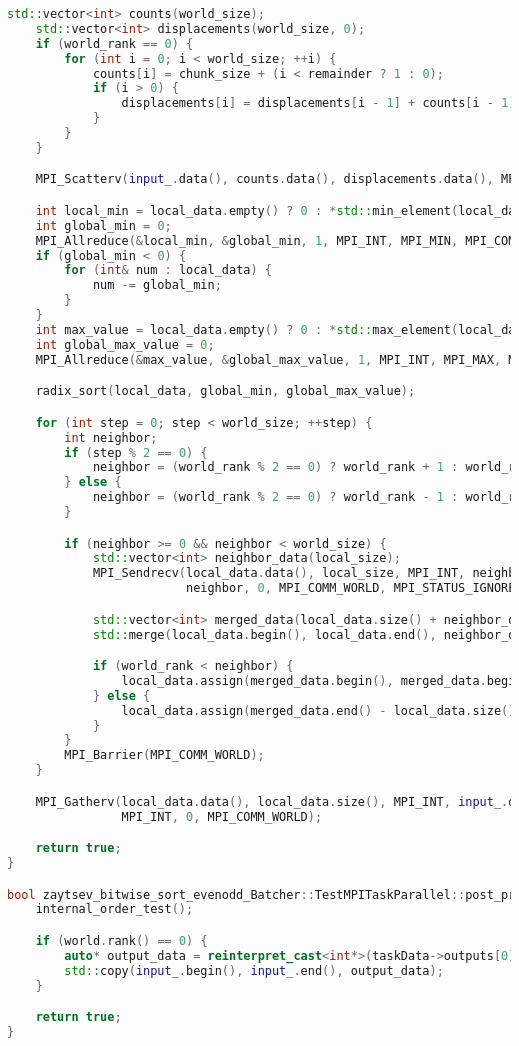 \documentclass[12pt]{article}
\begin{document}
\begin{lstlisting}[language=C++]
    std::vector<int> counts(world_size);
    std::vector<int> displacements(world_size, 0);
    if (world_rank == 0) {
        for (int i = 0; i < world_size; ++i) {
            counts[i] = chunk_size + (i < remainder ? 1 : 0);
            if (i > 0) {
                displacements[i] = displacements[i - 1] + counts[i - 1];
            }
        }
    }

    MPI_Scatterv(input_.data(), counts.data(), displacements.data(), MPI_INT, local_data.data(), local_size, MPI_INT, 0, MPI_COMM_WORLD);

    int local_min = local_data.empty() ? 0 : *std::min_element(local_data.begin(), local_data.end());
    int global_min = 0;
    MPI_Allreduce(&local_min, &global_min, 1, MPI_INT, MPI_MIN, MPI_COMM_WORLD);
    if (global_min < 0) {
        for (int& num : local_data) {
            num -= global_min;
        }
    }
    int max_value = local_data.empty() ? 0 : *std::max_element(local_data.begin(), local_data.end());
    int global_max_value = 0;
    MPI_Allreduce(&max_value, &global_max_value, 1, MPI_INT, MPI_MAX, MPI_COMM_WORLD);

    radix_sort(local_data, global_min, global_max_value);

    for (int step = 0; step < world_size; ++step) {
        int neighbor;
        if (step % 2 == 0) {
            neighbor = (world_rank % 2 == 0) ? world_rank + 1 : world_rank - 1;
        } else {
            neighbor = (world_rank % 2 == 0) ? world_rank - 1 : world_rank + 1;
        }

        if (neighbor >= 0 && neighbor < world_size) {
            std::vector<int> neighbor_data(local_size);
            MPI_Sendrecv(local_data.data(), local_size, MPI_INT, neighbor, 0, neighbor_data.data(), local_size, MPI_INT,
                         neighbor, 0, MPI_COMM_WORLD, MPI_STATUS_IGNORE);

            std::vector<int> merged_data(local_data.size() + neighbor_data.size());
            std::merge(local_data.begin(), local_data.end(), neighbor_data.begin(), neighbor_data.end(), merged_data.begin());

            if (world_rank < neighbor) {
                local_data.assign(merged_data.begin(), merged_data.begin() + local_data.size());
            } else {
                local_data.assign(merged_data.end() - local_data.size(), merged_data.end());
            }
        }
        MPI_Barrier(MPI_COMM_WORLD);
    }

    MPI_Gatherv(local_data.data(), local_data.size(), MPI_INT, input_.data(), counts.data(), displacements.data(),
                MPI_INT, 0, MPI_COMM_WORLD);

    return true;
}

bool zaytsev_bitwise_sort_evenodd_Batcher::TestMPITaskParallel::post_processing() {
    internal_order_test();

    if (world.rank() == 0) {
        auto* output_data = reinterpret_cast<int*>(taskData->outputs[0]);
        std::copy(input_.begin(), input_.end(), output_data);
    }

    return true;
}
\end{lstlisting}
\end{document}
